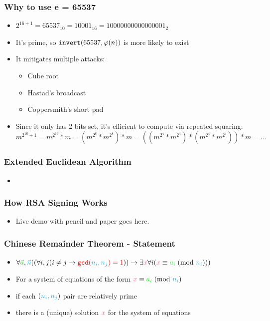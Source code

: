 \documentclass[aspectratio=169]{beamer}
\begin{document}
\begin{frame}[fragile]
\frametitle{Why to use e = 65537}
\begin{itemize}
\item $2^{16+1} = 65537_{10} = 10001_{16} = 10000000000000001_2$
\item It's prime, so $\verb|invert|(65537, \varphi(n))$ is more likely to exist
\item It mitigates multiple attacks:
\begin{itemize}
\item Cube root
\item Hastad's broadcast
\item Coppersmith's short pad
\end{itemize}
\item Since it only has 2 bits set, it's efficient to compute via repeated squaring:
$m^{2^{16}+1} = m^{2^{16}}*m = (m^{2^8}*m^{2^8})*m = ((m^{2^4}*m^{2^4})*(m^{2^4}*m^{2^4}))*m = \hdots$
\end{itemize}
\end{frame}

\begin{frame}[fragile]
\frametitle{Extended Euclidean Algorithm}
\begin{itemize}
\item {}
\end{itemize}
\end{frame}

\begin{frame}[fragile]
\frametitle{How RSA Signing Works}
\begin{itemize}
\item Live demo with pencil and paper goes here.
\end{itemize}
\end{frame}

\begin{frame}[fragile]
\frametitle{Chinese Remainder Theorem - Statement}
\begin{itemize}
\item $\forall {\color{green}\vec{a}}, {\color{cybercyan}\vec{n}}((\forall i,j(i \neq j \rightarrow {\color{red}\verb|gcd|({\color{cybercyan}n_i, n_j}) = 1})) \rightarrow \exists {\color{cyberpink}x} \forall i({\color{cyberpink}x} \equiv {\color{green}a_i}\hspace{1mm}(\text{mod }{\color{cybercyan}n_i})))$
\item For a system of equations of the form ${\color{cyberpink}x} \equiv {\color{green}a_i}\hspace{1mm}(\text{mod }{\color{cybercyan}n_i})$
\item if each $({\color{cybercyan}n_i, n_j})$ pair are {\color{red}relatively prime}
\item there is a (unique) solution ${\color{cyberpink}x}$ for the system of equations
\end{itemize}
\end{frame}
\end{document}
